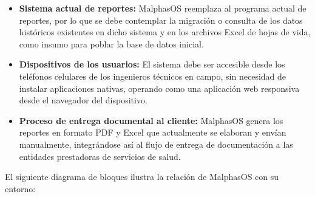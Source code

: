 \documentclass[12pt,a4paper]{article}
\begin{document}
\begin{itemize}
  \item \textbf{Sistema actual de reportes:} MalphasOS reemplaza al programa actual de reportes, por lo que se debe contemplar la migración o consulta de los datos históricos existentes en dicho sistema y en los archivos Excel de hojas de vida, como insumo para poblar la base de datos inicial.

  \item \textbf{Dispositivos de los usuarios:} El sistema debe ser accesible desde los teléfonos celulares de los ingenieros técnicos en campo, sin necesidad de instalar aplicaciones nativas, operando como una aplicación web responsiva desde el navegador del dispositivo.

  \item \textbf{Proceso de entrega documental al cliente:} MalphasOS genera los reportes en formato PDF y Excel que actualmente se elaboran y envían manualmente, integrándose así al flujo de entrega de documentación a las entidades prestadoras de servicios de salud.
\end{itemize}

El siguiente diagrama de bloques ilustra la relación de MalphasOS con su entorno:
\end{document}
